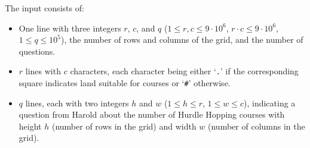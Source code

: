 
    The input consists of:
    \begin{itemize}
        \item One line with three integers $r$, $c$, and $q$
            ($1 \leq r,c \leq 9 \cdot 10^6$, $r \cdot c \leq 9 \cdot 10^6$, $1 \leq q \leq 10^5$),
            the number of rows and columns of the grid,
            and the number of questions.
        \item $r$ lines with $c$ characters, each character being either `\texttt{.}' if the corresponding square indicates land suitable for courses or `\texttt{\#}' otherwise.
        \item $q$ lines, each with two integers $h$ and $w$ ($1 \leq h \leq r$, $1 \leq w \leq c$),
            indicating a question from Harold about the number of Hurdle Hopping courses with
            height $h$ (number of rows in the grid) and width $w$ (number of columns in the grid).
    \end{itemize}
